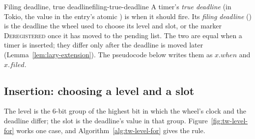 \begin{definition}{Filing deadline, true deadline}{filing-true-deadline}
    A timer's \emph{true deadline} (in Tokio, the value in the entry's atomic ) is when it should fire. Its \emph{filing deadline} () is the deadline the wheel used to choose its level and slot, or the marker \textsc{Deregistered} once it has moved to the pending list. The two are equal when a timer is inserted; they differ only after the deadline is moved later (Lemma~\ref{lem:lazy-extension}). The pseudocode below writes them as $x.\mathit{when}$ and $x.\mathit{filed}$.
\end{definition}

\subsection{Insertion: choosing a level and a slot}

The level is the 6-bit group of the highest bit in which the wheel's clock and the deadline differ; the slot is the deadline's value in that group. Figure~\ref{fig:tw-level-for} works one case, and Algorithm~\ref{alg:tw-level-for} gives the rule.

